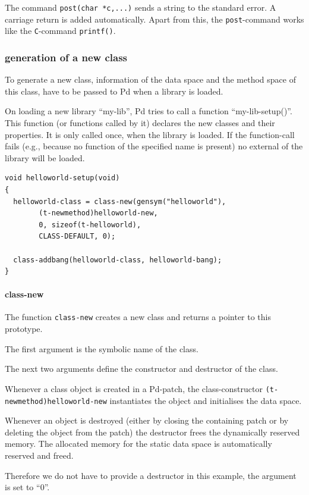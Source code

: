 \documentclass{ppgmus}
\begin{document}
The command \verb+post(char *c,...)+ sends a string to the standard error.
A carriage return is added automatically.
Apart from this, the \verb+post+-command works like the {\tt C}-command \verb+printf()+.

\subsubsection{generation of a new class}
To generate a new class, information of the data space and the method space of this class,
have to be passed to Pd when a library is loaded.

On loading a new library ``my-lib'',
Pd tries to call a function ``my-lib-setup()''.
This function (or functions called by it) 
declares the new classes and their properties.
It is only called once, when the library is loaded.
If the function-call fails (e.g., because no function of the specified name is present)
no external of the library will be loaded.

\begin{verbatim}
void helloworld-setup(void)
{
  helloworld-class = class-new(gensym("helloworld"),
        (t-newmethod)helloworld-new,
        0, sizeof(t-helloworld),
        CLASS-DEFAULT, 0);

  class-addbang(helloworld-class, helloworld-bang);
}
\end{verbatim}

\paragraph{class-new}

The function \verb+class-new+ creates a new class and returns a pointer to this prototype.

The first argument is the symbolic name of the class.

The next two arguments define the constructor and destructor of the class.

Whenever a class object is created in a Pd-patch,
the class-constructor \verb+(t-newmethod)helloworld-new+ instantiates the object
and initialises the data space.

Whenever an object is destroyed
(either by closing the containing patch or by deleting the object from the patch)
the destructor frees the dynamically reserved memory.
The allocated memory for the static data space is automatically reserved and freed.

Therefore we do not have to provide a destructor in this example, the argument
is set to ``0''.
\end{document}
